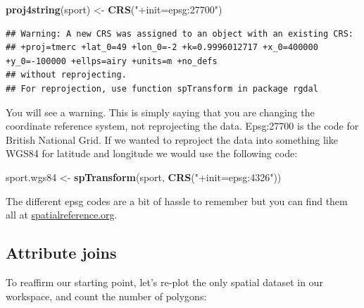 \documentclass[]{article}
\newenvironment{Shaded}{}{}
\newcommand{\KeywordTok}[1]{\textcolor[rgb]{0.00,0.44,0.13}{\textbf{{#1}}}}
\newcommand{\StringTok}[1]{\textcolor[rgb]{0.25,0.44,0.63}{{#1}}}
\newcommand{\NormalTok}[1]{{#1}}
\begin{document}
\begin{Shaded}
\begin{Highlighting}[]
\KeywordTok{proj4string}\NormalTok{(sport) <- }\KeywordTok{CRS}\NormalTok{(}\StringTok{"+init=epsg:27700"}\NormalTok{)}
\end{Highlighting}
\end{Shaded}
\begin{verbatim}
## Warning: A new CRS was assigned to an object with an existing CRS:
## +proj=tmerc +lat_0=49 +lon_0=-2 +k=0.9996012717 +x_0=400000 +y_0=-100000 +ellps=airy +units=m +no_defs
## without reprojecting.
## For reprojection, use function spTransform in package rgdal
\end{verbatim}
You will see a warning. This is simply saying that you are changing the
coordinate reference system, not reprojecting the data. Epsg:27700 is
the code for British National Grid. If we wanted to reproject the data
into something like WGS84 for latitude and longitude we would use the
following code:

\begin{Shaded}
\begin{Highlighting}[]
\NormalTok{sport.wgs84 <- }\KeywordTok{spTransform}\NormalTok{(sport, }\KeywordTok{CRS}\NormalTok{(}\StringTok{"+init=epsg:4326"}\NormalTok{))}
\end{Highlighting}
\end{Shaded}
The different epsg codes are a bit of hassle to remember but you can
find them all at
\href{http://spatialreference.org/}{spatialreference.org}.

\subsection{Attribute joins}

To reaffirm our starting point, let's re-plot the only spatial dataset
in our workspace, and count the number of polygons:
\end{document}
